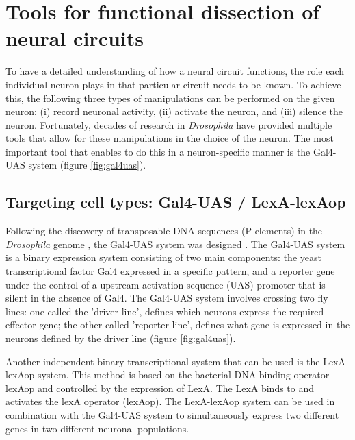 \section{Tools for functional dissection of \protect{} neural circuits}
To have a detailed understanding of how a neural circuit functions, the role each individual neuron plays in that particular circuit needs to be known. To achieve this, the following three types of manipulations can be performed on the given neuron: (i) record neuronal activity, (ii) activate the neuron, and (iii) silence the neuron. Fortunately, decades of research in \textit{Drosophila} have provided multiple tools that allow for these manipulations in the choice of the neuron. The most important tool that enables to do this in a neuron-specific manner is the Gal4-UAS system (figure \ref{fig:gal4uas}). 

\subsection{Targeting cell types: Gal4-UAS / LexA-lexAop}
Following the discovery of transposable DNA sequences (P-elements) in the \textit{Drosophila} genome \parencite{Rubin1982}, the Gal4-UAS system was designed \parencite{Brand1993}. The Gal4-UAS system is a binary expression system consisting of two main components: the yeast transcriptional factor Gal4 expressed in a specific pattern, and a reporter gene under the control of a upstream activation sequence (UAS) promoter that is silent in the absence of Gal4. The Gal4-UAS system involves crossing two fly lines: one called the 'driver-line', defines which neurons express the required effector gene; the other called 'reporter-line', defines what gene is expressed in the neurons defined by the driver line (figure \ref{fig:gal4uas}). 

Another independent binary transcriptional system that can be used is the LexA-lexAop system. This method is based on the bacterial DNA-binding operator lexAop and controlled by the expression of LexA. The LexA binds to and activates the lexA operator (lexAop). The LexA-lexAop system can be used in combination with the Gal4-UAS system to simultaneously express two different genes in two different neuronal populations. %

